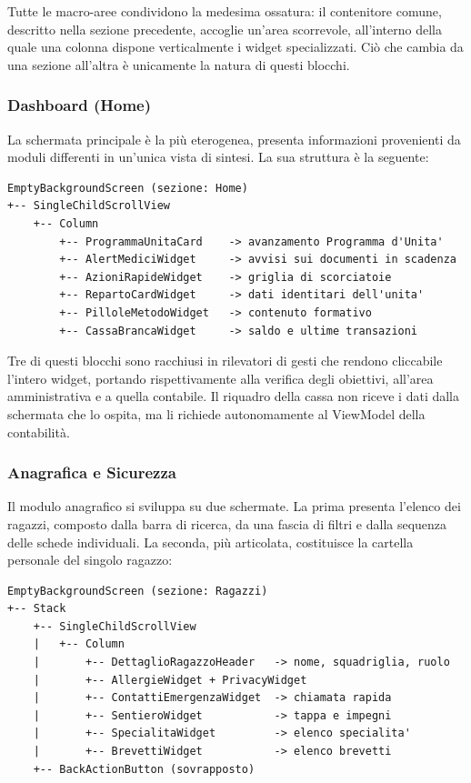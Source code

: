 \documentclass[11pt]{article}
\numberwithin{figure}{section}
\begin{document}
Tutte le macro-aree condividono la medesima ossatura: il contenitore comune, descritto nella sezione precedente, accoglie un'area scorrevole, all'interno della quale una colonna dispone verticalmente i widget specializzati. Ciò che cambia da una sezione all'altra è unicamente la natura di questi blocchi.

\subsubsection{Dashboard (Home)}

La schermata principale è la più eterogenea, presenta informazioni provenienti da moduli differenti in un'unica vista di sintesi. La sua struttura è la seguente:

\begin{verbatim}
EmptyBackgroundScreen (sezione: Home)
+-- SingleChildScrollView
    +-- Column
        +-- ProgrammaUnitaCard    -> avanzamento Programma d'Unita'
        +-- AlertMediciWidget     -> avvisi sui documenti in scadenza
        +-- AzioniRapideWidget    -> griglia di scorciatoie
        +-- RepartoCardWidget     -> dati identitari dell'unita'
        +-- PilloleMetodoWidget   -> contenuto formativo
        +-- CassaBrancaWidget     -> saldo e ultime transazioni
\end{verbatim}

Tre di questi blocchi sono racchiusi in rilevatori di gesti che rendono cliccabile l'intero widget, portando rispettivamente alla verifica degli obiettivi, all'area amministrativa e a quella contabile. Il riquadro della cassa non riceve i dati dalla schermata che lo ospita, ma li richiede autonomamente al ViewModel della contabilità.

\subsubsection{Anagrafica e Sicurezza}

Il modulo anagrafico si sviluppa su due schermate. La prima presenta l'elenco dei ragazzi, composto dalla barra di ricerca, da una fascia di filtri e dalla sequenza delle schede individuali. La seconda, più articolata, costituisce la cartella personale del singolo ragazzo:

\begin{verbatim}
EmptyBackgroundScreen (sezione: Ragazzi)
+-- Stack
    +-- SingleChildScrollView
    |   +-- Column
    |       +-- DettaglioRagazzoHeader   -> nome, squadriglia, ruolo
    |       +-- AllergieWidget + PrivacyWidget
    |       +-- ContattiEmergenzaWidget  -> chiamata rapida
    |       +-- SentieroWidget           -> tappa e impegni
    |       +-- SpecialitaWidget         -> elenco specialita'
    |       +-- BrevettiWidget           -> elenco brevetti
    +-- BackActionButton (sovrapposto)
\end{verbatim}
\end{document}
